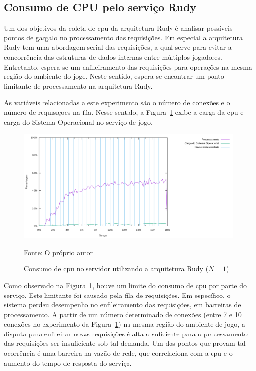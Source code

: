 \subsection{Consumo de CPU pelo serviço Rudy}

Um dos objetivos da coleta de \ac{cpu} da arquitetura Rudy é analisar possíveis pontos de gargalo no processamento das requisições.
%
Em especial a arquitetura Rudy tem uma abordagem serial das requisições, a qual serve para evitar a concorrência das estruturas de dados internas entre múltiplos jogadores.
%
Entretanto, espera-se um enfileiramento das requisições para operações na mesma região do ambiente do jogo.
%
Neste sentido, espera-se encontrar um ponto limitante de processamento na arquitetura Rudy.

As variáveis relacionadas a este experimento são o número de conexões e o número de requisições na fila.
%
Nesse sentido, a Figura~\ref{fig:rudy_t4_cpu} exibe a carga da \ac{cpu} e carga do Sistema Operacional no serviço de jogo.


\begin{figure}[htb!]
    \caption{Consumo de \ac{cpu} no servidor utilizando a arquitetura Rudy ($N=1$)}
    \label{fig:rudy_t4_cpu}
    \includegraphics[width=\textwidth]{metricas_rudy_t4/cpu.png}
    \centering
    
    Fonte: O próprio autor
\end{figure}


Como observado na Figura~\ref{fig:rudy_t4_cpu}, houve um limite do consumo de \ac{cpu} por parte do serviço.
%
Este limitante foi causado pela fila de requisições.
%
Em específico, o sistema perdeu desempenho no enfileiramento das requisições, em barreiras de processamento.
%
A partir de um número determinado de conexões (entre 7 e 10 conexões no experimento da Figura~\ref{fig:rudy_t4_cpu}) na mesma região do ambiente de jogo, a disputa para enfileirar novas requisições é alta o suficiente para o processamento das requisições ser insuficiente sob tal demanda.
%
Um dos pontos que provam tal ocorrência é uma barreira na vazão de rede, que correlaciona com a \ac{cpu} e o aumento do tempo de resposta do serviço.

